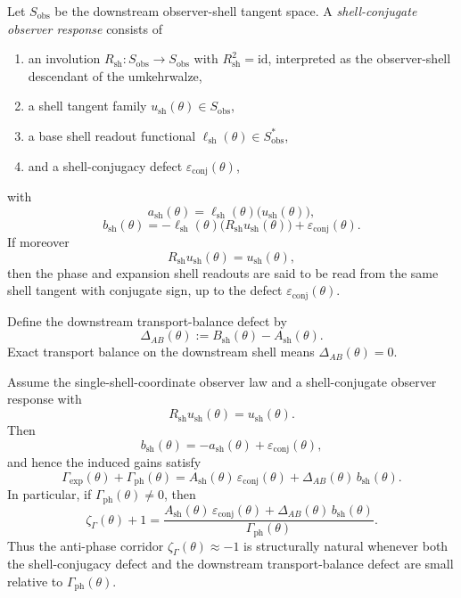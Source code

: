 \begin{definition}
Let $S_{\mathrm{obs}}$ be the downstream observer-shell tangent space. A \emph{shell-conjugate observer response} consists of
\begin{enumerate}[leftmargin=2em,label=(\roman*)]
\item an involution $R_{\mathrm{sh}}:S_{\mathrm{obs}}\to S_{\mathrm{obs}}$ with $R_{\mathrm{sh}}^2=\mathrm{id}$, interpreted as the observer-shell descendant of the umkehrwalze,
\item a shell tangent family $u_{\mathrm{sh}}(\theta)\in S_{\mathrm{obs}}$,
\item a base shell readout functional $\ell_{\mathrm{sh}}(\theta)\in S_{\mathrm{obs}}^*$,
\item and a shell-conjugacy defect $\varepsilon_{\mathrm{conj}}(\theta)$,
\end{enumerate}
with
\[
  a_{\mathrm{sh}}(\theta)=\ell_{\mathrm{sh}}(\theta)\bigl(u_{\mathrm{sh}}(\theta)\bigr),
\]
\[
  b_{\mathrm{sh}}(\theta)=-\ell_{\mathrm{sh}}(\theta)\bigl(R_{\mathrm{sh}}u_{\mathrm{sh}}(\theta)\bigr)+\varepsilon_{\mathrm{conj}}(\theta).
\]
If moreover
\[
  R_{\mathrm{sh}}u_{\mathrm{sh}}(\theta)=u_{\mathrm{sh}}(\theta),
\]
then the phase and expansion shell readouts are said to be read from the same shell tangent with conjugate sign, up to the defect $\varepsilon_{\mathrm{conj}}(\theta)$.
\end{definition}

\begin{definition}
Define the downstream transport-balance defect by
\[
  \Delta_{AB}(\theta):=B_{\mathrm{sh}}(\theta)-A_{\mathrm{sh}}(\theta).
\]
Exact transport balance on the downstream shell means $\Delta_{AB}(\theta)=0$.
\end{definition}

\begin{theorem}
Assume the single-shell-coordinate observer law and a shell-conjugate observer response with
\[
  R_{\mathrm{sh}}u_{\mathrm{sh}}(\theta)=u_{\mathrm{sh}}(\theta).
\]
Then
\[
  b_{\mathrm{sh}}(\theta)=-a_{\mathrm{sh}}(\theta)+\varepsilon_{\mathrm{conj}}(\theta),
\]
and hence the induced gains satisfy
\[
  \Gamma_{\mathrm{exp}}(\theta)+\Gamma_{\mathrm{ph}}(\theta)
  =A_{\mathrm{sh}}(\theta)\,\varepsilon_{\mathrm{conj}}(\theta)
   +\Delta_{AB}(\theta)\,b_{\mathrm{sh}}(\theta).
\]
In particular, if $\Gamma_{\mathrm{ph}}(\theta)\neq 0$, then
\[
  \zeta_{\Gamma}(\theta)+1
  =
  \frac{A_{\mathrm{sh}}(\theta)\,\varepsilon_{\mathrm{conj}}(\theta)
   +\Delta_{AB}(\theta)\,b_{\mathrm{sh}}(\theta)}{\Gamma_{\mathrm{ph}}(\theta)}.
\]
Thus the anti-phase corridor $\zeta_{\Gamma}(\theta)\approx -1$ is structurally natural whenever both the shell-conjugacy defect and the downstream transport-balance defect are small relative to $\Gamma_{\mathrm{ph}}(\theta)$.
\end{theorem}

